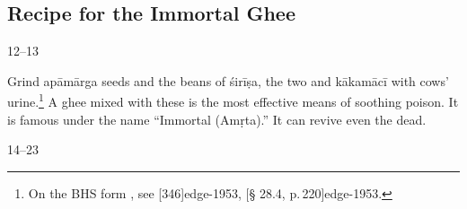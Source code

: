 \begin{translation}
    \subsection{Recipe for the Immortal Ghee}
    
\item [12--13]    

Grind \gls{apāmārga} seeds and the beans of \gls{śirīṣa}, the two 
 and \gls{kākamācī} with cows' urine.\footnote{On the BHS 
form , see [346]{edge-1953}, [\S 
28.4, p.\,220]{edge-1953}.}  A ghee mixed with 
these is the most effective means of soothing poison.  It is famous under the 
name “Immortal (Amṛta).”  It can revive even the dead.


\item [14--23] 


\end{translation}
